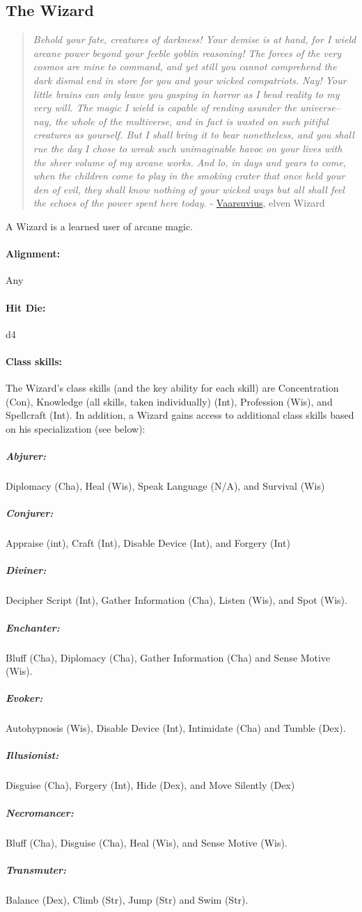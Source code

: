 \subsection[Wizard]{The Wizard}
\label{sec:Wizard}
\begin{quote}
\emph{Behold your fate, creatures of darkness! 
Your demise is at hand, for I wield arcane power beyond your feeble goblin reasoning! 
The forces of the very cosmos are mine to command, and yet still you cannot comprehend the dark dismal end in store for you and your wicked compatriots. 
Nay! Your little brains can only leave you gasping in horror as I bend reality to my very will. 
The magic I wield is capable of rending asunder the universe--nay, the whole of the multiverse, and in fact is wasted on such pitiful creatures as yourself. 
But I shall bring it to bear nonetheless, and you shall rue the day I chose to wreak such unimaginable havoc on your lives with the sheer volume of my arcane works. 
And lo, in days and years to come, when the children come to play in the smoking crater that once held your den of evil, 
they shall know nothing of your wicked ways but all shall feel the echoes of the power spent here today.}
- \href{http://www.giantitp.com/comics/oots0010.html}{Vaarsuvius}, elven Wizard
\end{quote}
A Wizard is a learned user of arcane magic.
\paragraph{Alignment:} Any
\paragraph{Hit Die:} d4
\paragraph{Class skills:}
The Wizard's class skills (and the key ability for each skill) are Concentration (Con), 
Knowledge (all skills, taken individually) (Int), Profession (Wis), and Spellcraft (Int). 
In addition, a Wizard gains access to additional class skills based on his specialization (see below):
\subparagraph{Abjurer:} Diplomacy (Cha), Heal (Wis), Speak Language (N/A), and Survival (Wis)
\subparagraph{Conjurer:} Appraise (int), Craft (Int), Disable Device (Int), and Forgery (Int)
\subparagraph{Diviner:} Decipher Script (Int), Gather Information (Cha), Listen (Wis), and Spot (Wis).
\subparagraph{Enchanter:} Bluff (Cha), Diplomacy (Cha), Gather Information (Cha) and Sense Motive (Wis).
\subparagraph{Evoker:} Autohypnosis (Wis), Disable Device (Int), Intimidate (Cha) and Tumble (Dex).
\subparagraph{Illusionist:} Disguise (Cha), Forgery (Int), Hide (Dex), and Move Silently (Dex)
\subparagraph{Necromancer:} Bluff (Cha), Disguise (Cha), Heal (Wis), and Sense Motive (Wis).
\subparagraph{Transmuter:} Balance (Dex), Climb (Str), Jump (Str) and Swim (Str).

